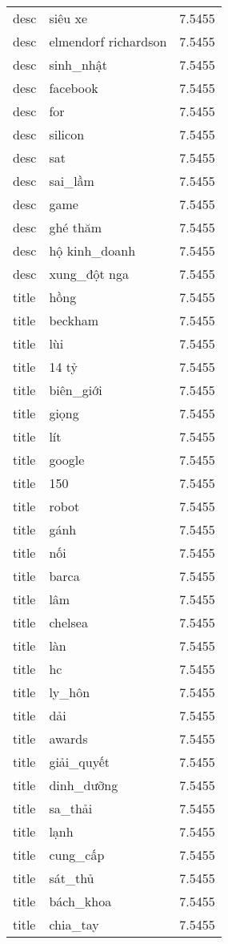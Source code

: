 \documentclass{article}
\begin{document}
\begin{tabular}{lll}
desc & siêu xe & 7.5455\\
desc & elmendorf richardson & 7.5455\\
desc & sinh\_nhật & 7.5455\\
desc & facebook & 7.5455\\
desc & for & 7.5455\\
desc & silicon & 7.5455\\
desc & sat & 7.5455\\
desc & sai\_lầm & 7.5455\\
desc & game & 7.5455\\
desc & ghé thăm & 7.5455\\
desc & hộ kinh\_doanh & 7.5455\\
desc & xung\_đột nga & 7.5455\\
title & hồng & 7.5455\\
title & beckham & 7.5455\\
title & lùi & 7.5455\\
title & 14 tỷ & 7.5455\\
title & biên\_giới & 7.5455\\
title & giọng & 7.5455\\
title & lít & 7.5455\\
title & google & 7.5455\\
title & 150 & 7.5455\\
title & robot & 7.5455\\
title & gánh & 7.5455\\
title & nối & 7.5455\\
title & barca & 7.5455\\
title & lâm & 7.5455\\
title & chelsea & 7.5455\\
title & làn & 7.5455\\
title & hc & 7.5455\\
title & ly\_hôn & 7.5455\\
title & dải & 7.5455\\
title & awards & 7.5455\\
title & giải\_quyết & 7.5455\\
title & dinh\_dưỡng & 7.5455\\
title & sa\_thải & 7.5455\\
title & lạnh & 7.5455\\
title & cung\_cấp & 7.5455\\
title & sát\_thủ & 7.5455\\
title & bách\_khoa & 7.5455\\
title & chia\_tay & 7.5455\\

\end{tabular}
\end{document}
